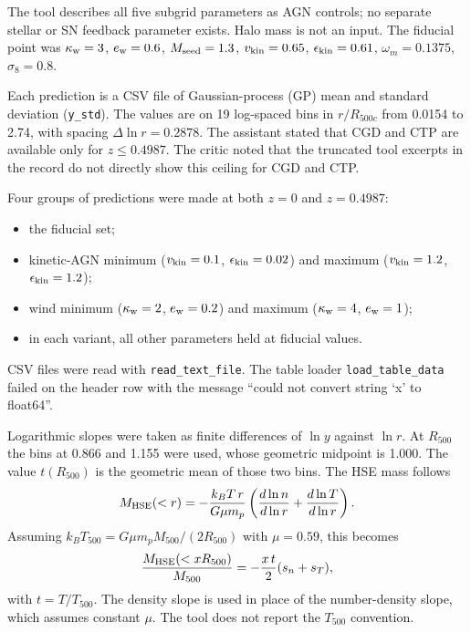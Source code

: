 \documentclass[11pt,a4paper]{article}
\begin{document}
The tool describes all five subgrid parameters as AGN controls; no separate stellar or SN feedback parameter exists. Halo mass is not an input. The fiducial point was $\kappa_{\rm w}=3$, $e_{\rm w}=0.6$, $M_{\rm seed}=1.3$, $v_{\rm kin}=0.65$, $\epsilon_{\rm kin}=0.61$, $\omega_m=0.1375$, $\sigma_8=0.8$.

Each prediction is a CSV file of Gaussian-process (GP) mean and standard deviation (\texttt{y\_std}). The values are on 19 log-spaced bins in $r/R_{500c}$ from 0.0154 to 2.74, with spacing $\Delta\ln r=0.2878$. The assistant stated that CGD and CTP are available only for $z\le0.4987$. The critic noted that the truncated tool excerpts in the record do not directly show this ceiling for CGD and CTP.

Four groups of predictions were made at both $z=0$ and $z=0.4987$:
\begin{itemize}
\item the fiducial set;
\item kinetic-AGN minimum ($v_{\rm kin}=0.1$, $\epsilon_{\rm kin}=0.02$) and maximum ($v_{\rm kin}=1.2$, $\epsilon_{\rm kin}=1.2$);
\item wind minimum ($\kappa_{\rm w}=2$, $e_{\rm w}=0.2$) and maximum ($\kappa_{\rm w}=4$, $e_{\rm w}=1$);
\item in each variant, all other parameters held at fiducial values.
\end{itemize}
CSV files were read with \texttt{read\_text\_file}. The table loader \texttt{load\_table\_data} failed on the header row with the message ``could not convert string `x' to float64''.

Logarithmic slopes were taken as finite differences of $\ln y$ against $\ln r$. At $R_{500}$ the bins at 0.866 and 1.155 were used, whose geometric midpoint is 1.000. The value $t(R_{500})$ is the geometric mean of those two bins. The HSE mass follows
\begin{equation}
M_{\rm HSE}(<r) = -\frac{k_B T\, r}{G\mu m_p}\left(\frac{d\ln n}{d\ln r}+\frac{d\ln T}{d\ln r}\right).
\end{equation}
Assuming $k_BT_{500}=G\mu m_p M_{500}/(2R_{500})$ with $\mu=0.59$, this becomes
\begin{equation}
\frac{M_{\rm HSE}(<xR_{500})}{M_{500}}=-\frac{x\,t}{2}(s_n+s_T),
\end{equation}
with $t=T/T_{500}$. The density slope is used in place of the number-density slope, which assumes constant $\mu$. The tool does not report the $T_{500}$ convention.
\end{document}
